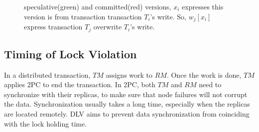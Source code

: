 \documentclass[conference]{IEEEtran}
\begin{document}
\begin{figure}[htbp]
{  }
  \caption{speculative(green) and committed(red) versions,
  ${x_i}$ expresses this version is from transaction transaction ${T_i}$'s write.
So, $w_j[x_i]$ express transaction ${T_j}$ overwrite ${T_i}$'s write.
}

\label{fig:versions_example}
\end{figure}

\subsection {Timing of Lock Violation}


In a distributed transaction, $TM$ assigns work to $RM$. Once the work is done, $TM$ applies 2PC to end the transaction.
In 2PC, both $TM$ and $RM$ need to synchronize with their replicas, to make sure that node failures will not corrupt the data.
Synchronization usually takes a long time, especially when the replicas are located remotely.
DLV aims to prevent data synchronization from coinciding with the lock holding time.
\end{document}
